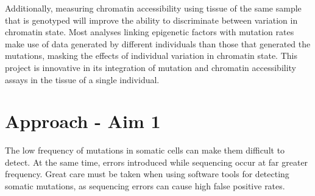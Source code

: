 Additionally, measuring chromatin accessibility using tissue of the same sample that is genotyped will improve the ability to discriminate between variation in chromatin state.
Most analyses linking epigenetic factors with mutation rates make use of data generated by different individuals than those that generated the mutations, masking the effects of individual variation in chromatin state. This project is innovative in its integration of mutation and chromatin accessibility assays in the tissue of a single individual.







\section{Approach - Aim 1}
The low frequency of mutations in somatic cells can make them difficult to detect.
At the same time, errors introduced while sequencing occur at far greater frequency.
Great care must be taken when using software tools for detecting somatic mutations, as sequencing errors can cause high false positive rates.

